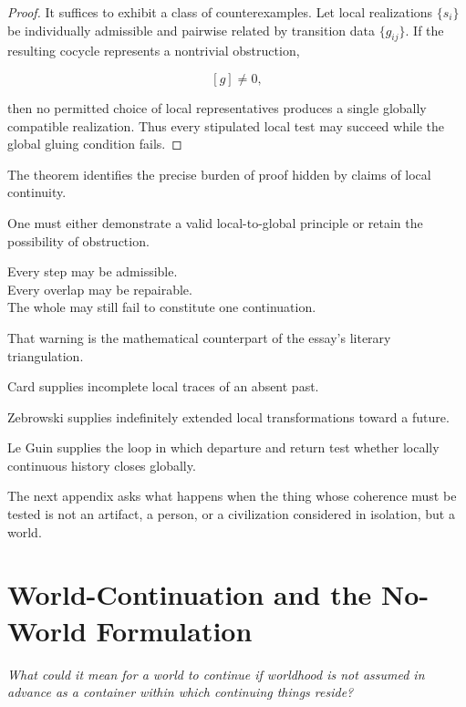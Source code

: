\documentclass[
  11pt,
  a4paper,
  DIV=12,
  BCOR=0mm,
  parskip=half-
]{scrartcl}
\theoremstyle{definition}
\theoremstyle{plain}
\theoremstyle{remark}
\newcommand{\movementquestion}[1]{%
  \begin{center}
    \small\itshape
    #1
  \end{center}
  \medskip
}
\begin{document}
\begin{proof}
It suffices to exhibit a class of counterexamples. Let local realizations
\(\{s_i\}\) be individually admissible and pairwise related by transition data
\(\{g_{ij}\}\). If the resulting cocycle represents a nontrivial obstruction,

\[
  [g]\neq 0,
\]

then no permitted choice of local representatives produces a single globally
compatible realization. Thus every stipulated local test may succeed while
the global gluing condition fails.
\end{proof}

The theorem identifies the precise burden of proof hidden by claims of local
continuity.

One must either demonstrate a valid local-to-global principle or retain the
possibility of obstruction.

\begin{held}
\centering
Every step may be admissible.\\
Every overlap may be repairable.\\
The whole may still fail to constitute one continuation.
\end{held}

That warning is the mathematical counterpart of the essay's literary
triangulation.

Card supplies incomplete local traces of an absent past.

Zebrowski supplies indefinitely extended local transformations toward a
future.

Le Guin supplies the loop in which departure and return test whether locally
continuous history closes globally.

The next appendix asks what happens when the thing whose coherence must be
tested is not an artifact, a person, or a civilization considered in
isolation, but a world.


\section{World-Continuation and the No-World Formulation}
\label{app:worldhood}

\movementquestion{What could it mean for a world to continue if worldhood is not assumed in advance as a container within which continuing things reside?}
\end{document}
